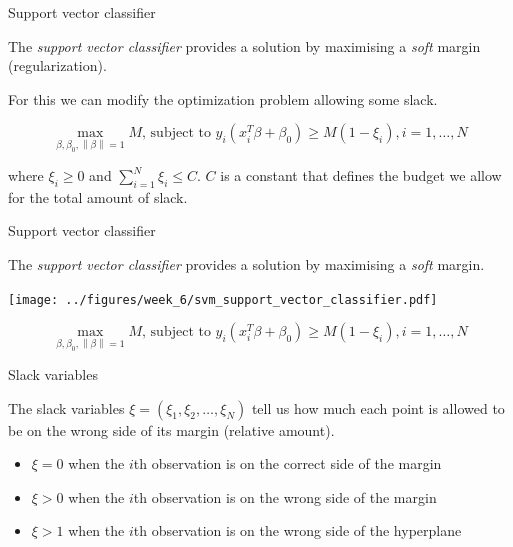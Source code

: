 \documentclass[notes]{beamer}          %
\newcommand{\norm}[1]{\left\lVert#1\right\rVert}
\providecommand{\norm}[1]{\lVert#1\rVert}
\begin{document}
\begin{frame}{Support vector classifier}

The \textit{support vector classifier} provides a solution by maximising a \textit{soft} margin (regularization).

\vspace{5mm}

For this we can modify the optimization problem allowing some slack.

\begin{equation*}
\max_{\beta, \beta_0, \norm{\beta} = 1} M \text{, subject to } y_i(x^T_i \beta + \beta_0) \geq M (1-\xi_i), i=1, \dots, N
\end{equation*}

where $\xi_i \geq 0$ and $\sum_{i=1}^N \xi_i \leq C$. $C$ is a constant that defines the budget we allow for the total amount of slack.

\vspace{5mm}



\end{frame}


\begin{frame}{Support vector classifier}

The \textit{support vector classifier} provides a solution by maximising a \textit{soft} margin.
\begin{center}
\texttt{[image: ../figures/week\_6/svm\_support\_vector\_classifier.pdf]}  
\end{center}

\vspace{-7mm} 

\begin{equation*}
\max_{\beta, \beta_0, \norm{\beta} = 1} M \text{, subject to } y_i(x^T_i \beta + \beta_0) \geq M (1-\xi_i), i=1, \dots, N
\end{equation*}

\end{frame}

\begin{frame}{Slack variables}

The slack variables $\xi = (\xi_1, \xi_2, \dots, \xi_N)$ tell us how much each point is allowed to be on the wrong side of its margin (relative amount).

\begin{itemize}
    \item $\xi = 0$ when the $i$th observation is on the correct side of the margin
    \item $\xi > 0$ when the $i$th observation is on the wrong side of the margin
    \item $\xi > 1$ when the $i$th observation is on the wrong side of the hyperplane
\end{itemize}
\end{frame}
\end{document}
